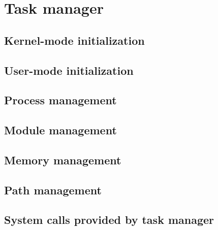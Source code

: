 
\section{Task manager}

\subsection{Kernel-mode initialization}

\subsection{User-mode initialization}

\subsection{Process management}

\subsection{Module management}

\subsection{Memory management}

\subsection{Path management}

\subsection{System calls provided by task manager}
